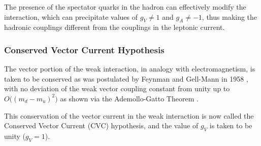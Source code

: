The presence of the spectator quarks in the hadron
can effectively modify the interaction, which can
precipitate values of $g_V\neq 1$ and $g_A\neq -1$,
thus making the hadronic couplings different from the
couplings in the leptonic current.

\subsubsection{Conserved Vector Current Hypothesis}

The vector portion of the weak interaction, in analogy with
electromagnetism, is taken to be conserved as was postulated by Feynman and Gell-Mann in
1958 \cite{feynman1958},
with no deviation of the weak vector coupling constant from unity up to $O\big((m_d-m_u)^2\big)$
as shown via the Ademollo-Gatto Theorem \cite{ademollo1964nonrenormalization}.

This conservation of the vector current in the weak interaction is now called the
Conserved Vector Current (CVC) hypothesis, and the value of $g_V$ is taken to be unity ($g_V = 1$).

